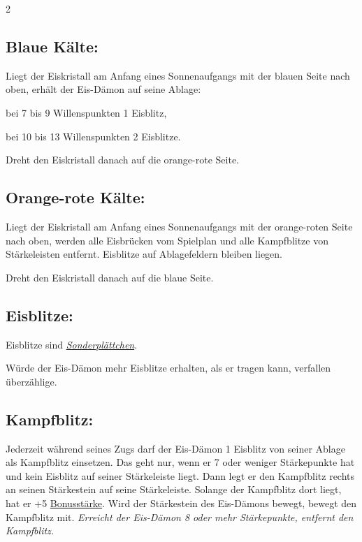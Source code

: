 \documentclass[10pt, a4paper, oneside]{book}
\newcommand{\fan}[1]{\textit{#1}}
\begin{document}
\begin{multicols*}{2}
\begin{nobgcolor}
\subsection{Blaue Kälte:}

Liegt der Eiskristall am Anfang eines Sonnenaufgangs mit der blauen Seite nach oben, erhält der Eis-Dämon auf seine Ablage:

\bullet{} bei 7 bis 9 Willenspunkten 1 Eisblitz,

\bullet{} bei 10 bis 13 Willenspunkten 2 Eisblitze.

Dreht den Eiskristall danach auf die orange-rote Seite.
\supercite{MH:Kälte,MH:Begleitheft}


\subsection{Orange-rote Kälte:}

Liegt der Eiskristall am Anfang eines Sonnenaufgangs mit der orange-roten Seite nach oben, werden alle Eisbrücken vom Spielplan und alle Kampfblitze von Stärkeleisten entfernt. Eisblitze auf Ablagefeldern bleiben liegen.

Dreht den Eiskristall danach auf die blaue Seite.
\supercite{MH:Kälte,MH:Begleitheft}




\subsection{Eisblitze:}

Eisblitze sind \hyperref[Gegenstände und Sonderplättchen]{\fan{Sonderplättchen}}. 

Würde der Eis-Dämon mehr Eisblitze erhalten, als er tragen kann, verfallen überzählige.
\supercite{MH:Begleitheft}



\columnbreak


\subsection{Kampfblitz:}


Jederzeit während seines Zugs darf der Eis-Dämon 1 Eisblitz von seiner Ablage als Kampfblitz einsetzen. Das geht nur, wenn er 7 oder weniger Stärkepunkte hat und kein Eisblitz auf seiner Stärkeleiste liegt.
\supercite{MH:Kälte}
Dann legt er den Kampfblitz rechts an seinen Stärkestein auf seine Stärkeleiste. Solange der Kampfblitz dort liegt, hat er +5 \hyperref[Bonusstärke]{Bonusstärke}.
\supercite{MH:Begleitheft}
Wird der Stärkestein des Eis-Dämons bewegt, bewegt den Kampfblitz mit.
\supercite{88778} 
\fan{Erreicht der Eis-Dämon 8 oder mehr Stärkepunkte, entfernt den Kampfblitz.}





\end{nobgcolor}
\end{multicols*}
\end{document}
